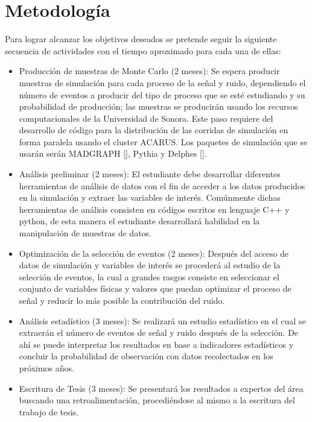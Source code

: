 \chapter{Metodología}
Para lograr alcanzar los objetivos deseados se pretende seguir la siguiente secuencia de actividades con el tiempo aproximado para cada una de ellas:
\begin{itemize}
    \item Producción de muestras de Monte Carlo (2 meses): Se espera producir muestras de simulación para cada proceso de la señal y ruido, dependiendo el número de eventos a producir del tipo de proceso que se esté estudiando y su probabilidad de producción; las muestras se producirán usando los recursos computacionales de la Universidad de Sonora. Este paso requiere del desarrollo de código para la distribución de las corridas de simulación en forma paralela usando el cluster ACARUS. Los paquetes de simulación que se usarán serán MADGRAPH [], Pythia y Delphes [].
    \item Análisis preliminar (2 meses): El estudiante debe desarrollar diferentes herramientas de análisis de datos con el fin de acceder a los datos producidos en la simulación y extraer las variables de interés. Comúnmente dichas herramientas de análisis consisten en códigos escritos en lenguaje C++ y python, de esta manera el estudiante desarrollará habilidad en la manipulación de muestras de datos.
    \item Optimización de la selección de eventos (2 meses): Después del acceso de datos de simulación y variables de interés se procederá al estudio de la selección de eventos, la cual a grandes rasgos consiste en seleccionar el conjunto de variables físicas y valores que puedan optimizar el proceso de señal y reducir lo más posible la contribución del ruido.
    \item Análisis estadístico (3 meses): Se realizará un estudio estadístico en el cual se extraerán el número de eventos de señal y ruido después de la selección. De ahí se puede interpretar los resultados en base a indicadores estadísticos y concluir la probabilidad de observación con datos recolectados en los próximos años.
    \item Escritura de Tesis (3 meses): Se presentará los resultados a expertos del área buscando una retroalimentación, procediéndose al mismo a la escritura del trabajo de tesis.
\end{itemize}
